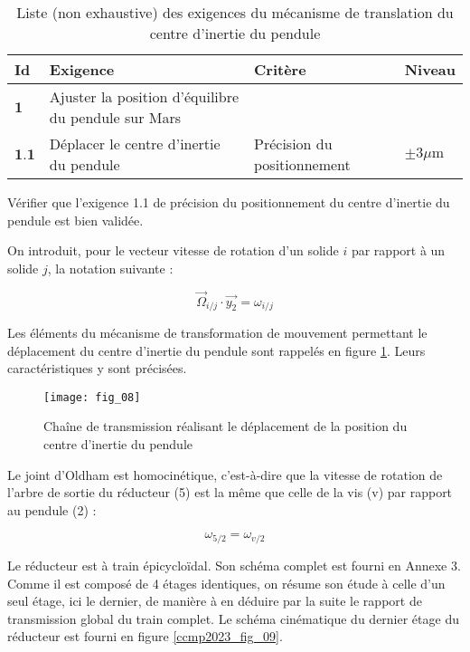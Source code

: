 \begin{table}[!h]
\centering
\begin{tabular}{llll}
\hline
Id & Exigence & Critère & Niveau \\
\hline
$\mathbf{1}$ & Ajuster la position d'équilibre du pendule sur Mars &  &  \\
\hline
$\mathbf{1 . 1}$ & Déplacer le centre d'inertie du pendule & Précision du positionnement & $\pm 3 \mu \mathrm{m}$ \\
\hline
\end{tabular}
\caption{\label{ccmp2023_tab_01} Liste (non exhaustive) des exigences du mécanisme de translation du centre d'inertie du pendule}
\end{table}

\begin{obj}
Vérifier que l'exigence 1.1 de précision du positionnement du centre d'inertie du pendule est bien validée.
\end{obj}

On introduit, pour le vecteur vitesse de rotation d'un solide $i$ par rapport à un solide $j$, la notation suivante :

$$
\vec{\Omega}_{i / j} \cdot \overrightarrow{y_{2}}=\omega_{i / j}
$$

Les éléments du mécanisme de transformation de mouvement permettant le déplacement du centre d'inertie du pendule sont rappelés en figure \ref{ccmp2023_fig_08}. Leurs caractéristiques y sont précisées.

\begin{figure}[!h]
\centering
\texttt{[image: fig\_08]}
\caption{\label{ccmp2023_fig_08} Chaîne de transmission réalisant le déplacement de la position du centre d'inertie du pendule}
\end{figure}



Le joint d'Oldham est homocinétique, c'est-à-dire que la vitesse de rotation de l'arbre de sortie du réducteur (5) est la même que celle de la vis (v) par rapport au pendule (2) :

$$
\omega_{5 / 2}=\omega_{v / 2}
$$

Le réducteur est à train épicycloïdal. Son schéma complet est fourni en Annexe 3. Comme il est composé de 4 étages identiques, on résume son étude à celle d'un seul étage, ici le dernier, de manière à en déduire par la suite le rapport de transmission global du train complet. Le schéma cinématique du dernier étage du réducteur est fourni en figure \ref{ccmp2023_fig_09}.


